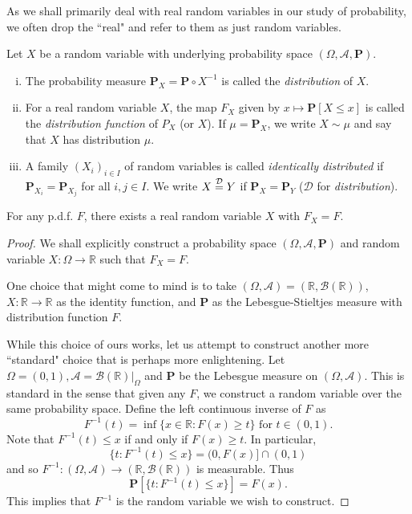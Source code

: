 As we shall primarily deal with real random variables in our study of probability, we often drop the ``real" and refer to them as just random variables.

\begin{definition}
    Let $X$ be a random variable with underlying probability space $(\Omega,\mathcal{A},\textbf{P})$.
    \begin{enumerate}[(i)]
        \item The probability measure $\textbf{P}_X=\textbf{P}\circ X^{-1}$ is called the \textit{distribution} of $X$.
        \item For a real random variable $X$, the map $F_X$ given by $x\mapsto\textbf{P}[X\leq x]$ is called the \textit{distribution function} of $P_X$ (or $X$). If $\mu=\textbf{P}_X$, we write $X\sim\mu$ and say that $X$ has distribution $\mu$.
        \item A family $(X_i)_{i\in I}$ of random variables is called \textit{identically distributed} if $\textbf{P}_{X_i}=\textbf{P}_{X_j}$ for all $i,j\in I$. We write $X\stackrel{\mathcal{D}}{=} Y$ if $\textbf{P}_X=\textbf{P}_Y$ ($\mathcal{D}$ for \textit{distribution}).
    \end{enumerate}
\end{definition}

\begin{theorem}
    For any p.d.f. $F$, there exists a real random variable $X$ with $F_X=F$.
\end{theorem}

\begin{proof}
    We shall explicitly construct a probability space $(\Omega,\mathcal{A},\textbf{P})$ and random variable $X:\Omega\to\mathbb{R}$ such that $F_X=F$.
    
    \vspace{1mm}
    One choice that might come to mind is to take $(\Omega,\mathcal{A}) = (\mathbb{R},\mathcal{B}(\mathbb{R}))$, $X:\mathbb{R}\to\mathbb{R}$ as the identity function, and $\textbf{P}$ as the Lebesgue-Stieltjes measure with distribution function $F$.
    
    \vspace{1.5mm}
    While this choice of ours works, let us attempt to construct another more ``standard" choice that is perhaps more enlightening. Let $\Omega=(0,1),\mathcal{A}=\left.\mathcal{B}(\mathbb{R})\right|_\Omega$ and $\textbf{P}$ be the Lebesgue measure on $(\Omega,\mathcal{A})$. This is standard in the sense that given any $F$, we construct a random variable over the same probability space. Define the left continuous inverse of $F$ as
    $$F^{-1}(t)=\inf\{x\in\mathbb{R}:F(x)\geq t\}\text{ for }t\in (0,1).$$
    Note that $F^{-1}(t)\leq x$ if and only if $F(x)\geq t$.
    In particular,
    $$\{t:F^{-1}(t)\leq x\}=(0,F(x)]\cap(0,1)$$
    and so $F^{-1}:(\Omega,\mathcal{A})\to(\mathbb{R},\mathcal{B}(\mathbb{R}))$ is measurable. Thus
    $$\textbf{P}\left[\{t:F^{-1}(t)\leq x\}\right]=F(x).$$
    This implies that $F^{-1}$ is the random variable we wish to construct.
\end{proof}

